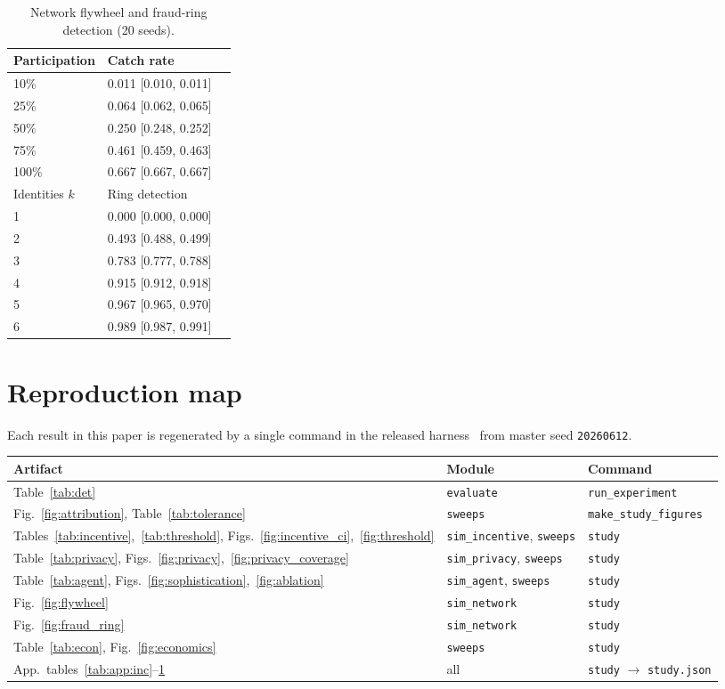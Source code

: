 \documentclass[11pt]{article}
\newcommand{\code}[1]{\texttt{\small #1}}
\begin{document}
\begin{table}[h]\centering\small\caption{Network flywheel and fraud-ring detection (20 seeds).}\label{tab:app:net}
\begin{tabular}{lll}\toprule Participation & Catch rate & \\\midrule
10\% & 0.011 [0.010, 0.011] & \\
25\% & 0.064 [0.062, 0.065] & \\
50\% & 0.250 [0.248, 0.252] & \\
75\% & 0.461 [0.459, 0.463] & \\
100\% & 0.667 [0.667, 0.667] & \\
\midrule Identities $k$ & Ring detection & \\\midrule
1 & 0.000 [0.000, 0.000] & \\
2 & 0.493 [0.488, 0.499] & \\
3 & 0.783 [0.777, 0.788] & \\
4 & 0.915 [0.912, 0.918] & \\
5 & 0.967 [0.965, 0.970] & \\
6 & 0.989 [0.987, 0.991] & \\
\bottomrule\end{tabular}\end{table}

\section{Reproduction map}\label{app:repromap}
Each result in this paper is regenerated by a single command in the released
harness~\cite{truthhirecode} from master seed \texttt{20260612}.

\begin{table}[h]\centering\small
\begin{tabular}{lll}
\toprule
Artifact & Module & Command\\
\midrule
Table~\ref{tab:det} & \code{evaluate} & \code{run\_experiment}\\
Fig.~\ref{fig:attribution}, Table~\ref{tab:tolerance} & \code{sweeps} & \code{make\_study\_figures}\\
Tables~\ref{tab:incentive},~\ref{tab:threshold}, Figs.~\ref{fig:incentive_ci},~\ref{fig:threshold} & \code{sim\_incentive}, \code{sweeps} & \code{study}\\
Table~\ref{tab:privacy}, Figs.~\ref{fig:privacy},~\ref{fig:privacy_coverage} & \code{sim\_privacy}, \code{sweeps} & \code{study}\\
Table~\ref{tab:agent}, Figs.~\ref{fig:sophistication},~\ref{fig:ablation} & \code{sim\_agent}, \code{sweeps} & \code{study}\\
Fig.~\ref{fig:flywheel} & \code{sim\_network} & \code{study}\\
Fig.~\ref{fig:fraud_ring} & \code{sim\_network} & \code{study}\\
Table~\ref{tab:econ}, Fig.~\ref{fig:economics} & \code{sweeps} & \code{study}\\
App.\ tables~\ref{tab:app:inc}--\ref{tab:app:net} & all & \code{study} $\to$ \code{study.json}\\
\bottomrule
\end{tabular}
\end{table}
\end{document}
